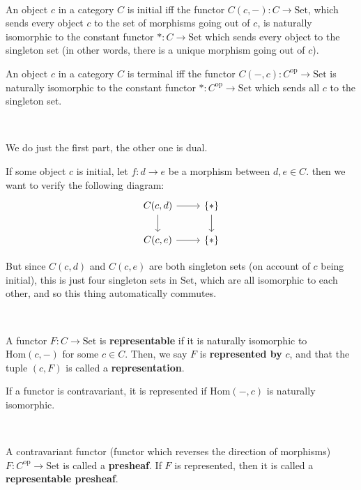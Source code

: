 \documentclass{article}
\begin{document}
\begin{theorem}
	\

	An object $c$ in a category $C$ is initial iff the functor $C(c, -): C \to \text{Set}$, which sends every object $c$ to the set of morphisms going out of $c$, is naturally isomorphic to the constant functor $*: C \to \text{Set}$ which sends every object to the singleton set (in other words, there is a unique morphism going out of $c$).

	An object $c$ in a category $C$ is terminal iff the functor $C(-, c): C^\text{op} \to \text{Set}$ is naturally isomorphic to the constant functor $*: C^\text{op} \to \text{Set}$ which sends all $c$ to the singleton set.
\end{theorem}

\begin{customproof}
	\

	We do just the first part, the other one is dual.

	If some object $c$ is initial, let $f: d \to e$ be a morphism between $d, e \in C$. then we want to verify the following diagram: \[\begin{tikzcd}
			C(c,d) & \{*\}\\
			C(c,e) & \{*\}
			\arrow[from=1-1, to=1-2]
			\arrow[from=1-1, to=2-1]
			\arrow[from=2-1, to=2-2]
			\arrow[from=1-2, to=2-2]
		\end{tikzcd}\]

	But since $C(c,d)$ and $C(c,e)$ are both singleton sets (on account of $c$ being initial), this is just four singleton sets in $\text{Set}$, which are all isomorphic to each other, and so this thing automatically commutes.
\end{customproof}

\begin{definition}
	\

	A functor $F: C \to \text{Set}$ is \textbf{representable} if it is naturally isomorphic to $\text{Hom}(c, -)$ for some $c \in C$. Then, we say $F$ is \textbf{represented by} $c$, and that the tuple $(c, F)$ is called a \textbf{representation}.

	If a functor is contravariant, it is represented if $\text{Hom}(-, c)$ is naturally isomorphic.
\end{definition}

\begin{definition}[Presheaf]
	\

	A contravariant functor (functor which reverses the direction of morphisms) $F: C^\text{op} \to \text{Set}$ is called a \textbf{presheaf}. If $F$ is represented, then it is called a \textbf{representable presheaf}.
\end{definition}
\end{document}
